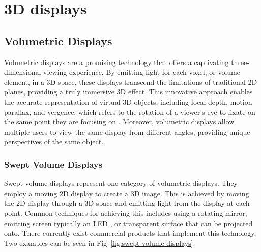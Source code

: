 \section{3D displays}

\subsection{Volumetric Displays}
Volumetric displays \cite{1492264} are a promising technology that offers a captivating three-dimensional viewing experience. By emitting light for each voxel, or volume element, in a 3D space, these displays transcend the limitations of traditional 2D planes, providing a truly immersive 3D effect. This innovative approach enables the accurate representation of virtual 3D objects, including focal depth, motion parallax, and vergence, which refers to the rotation of a viewer's eye to fixate on the same point they are focusing on . Moreover, volumetric displays allow multiple users to view the same display from different angles, providing unique perspectives of the same object. 

\subsubsection{Swept Volume Displays}
Swept volume displays represent one category of volumetric displays. They employ a moving 2D display to create a 3D image. This is achieved by moving the 2D display through a 3D space and emitting light from the display at each point. Common techniques for achieving this includes using a rotating mirror, emitting screen typically an LED \cite{Gately:11}, or transparent surface that can be projected onto. There currently exist commercial products that implement this technology, Two examples can be seen in Fig~\ref{fig:swept-volume-displays}.

